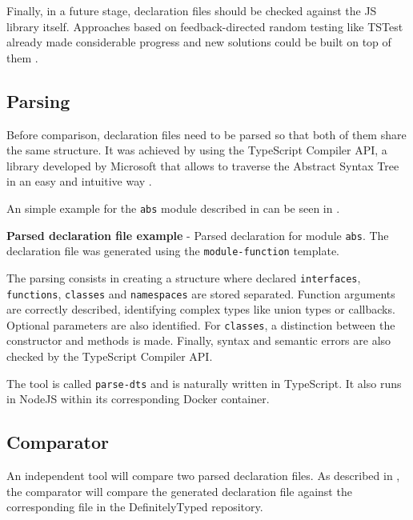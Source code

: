 Finally, in a future stage, declaration files should be checked against the JS library itself. Approaches based on feedback-directed random testing like TSTest already made considerable progress and new solutions could be built on top of them \citep{DBLP:journals/pacmpl/KristensenM17}.



\subsection{Parsing} \label{sec:approach-parsing}
Before comparison, declaration files need to be parsed so that both of them share the same structure. It was achieved by using the TypeScript Compiler API, a library developed by Microsoft that allows to traverse the Abstract Syntax Tree in an easy and intuitive way \citep{ts-compiler-api}.

An simple example for the \texttt{abs} module described in  can be seen in . 

\begin{code}
  \captionsetup{aboveskip=0pt, belowskip=10pt}
  \caption[Parsed declaration file example]{\textbf{Parsed declaration file example} - Parsed declaration for module \texttt{abs}. The declaration file was generated using the \texttt{module-function} template.}
  \label{code:parsing-module-function}
\end{code}

The parsing consists in creating a structure where declared \texttt{interfaces}, \texttt{functions}, \texttt{classes} and \texttt{namespaces} are stored separated. Function arguments are correctly described, identifying complex types like union types or callbacks. Optional parameters are also identified. For \texttt{classes}, a distinction between the constructor and methods is made. Finally, syntax and semantic errors are also checked by the TypeScript Compiler API.

The tool is called \texttt{parse-dts} and is naturally written in TypeScript. It also runs in NodeJS within its corresponding Docker container.

\subsection{Comparator}
An independent tool will compare two parsed declaration files. As described in , the comparator will compare the generated declaration file against the corresponding file in the DefinitelyTyped repository.

